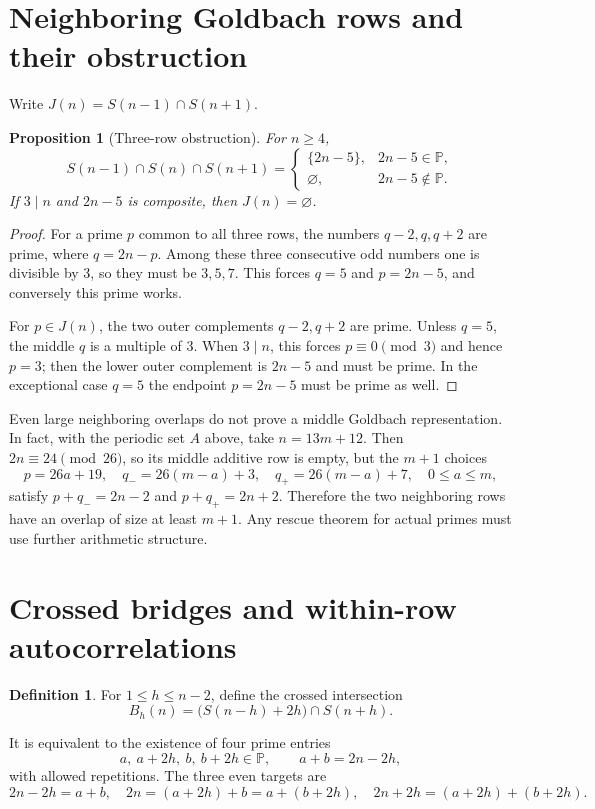 \documentclass[11pt,a4paper]{article}
\newtheorem{proposition}[theorem]{Proposition}
\theoremstyle{definition}
\newtheorem{definition}[theorem]{Definition}
\newcommand{\PP}{\mathbb P}
\begin{document}
\section{Neighboring Goldbach rows and their obstruction}
Write $J(n)=S(n-1)\cap S(n+1)$.
\begin{proposition}[Three-row obstruction]\label{prop:triple}
For $n\ge4$,
\begin{equation}\label{eq:triple}
 S(n-1)\cap S(n)\cap S(n+1)
 =\begin{cases}
 \{2n-5\},&2n-5\in\PP,\\
 \varnothing,&2n-5\notin\PP.
 \end{cases}
\end{equation}
If $3\mid n$ and $2n-5$ is composite, then $J(n)=\varnothing$.
\end{proposition}
\begin{proof}
For a prime $p$ common to all three rows, the numbers $q-2,q,q+2$ are prime, where $q=2n-p$. Among these three consecutive odd numbers one is divisible by 3, so they must be $3,5,7$. This forces $q=5$ and $p=2n-5$, and conversely this prime works.

For $p\in J(n)$, the two outer complements $q-2,q+2$ are prime. Unless $q=5$, the middle $q$ is a multiple of 3. When $3\mid n$, this forces $p\equiv0\pmod3$ and hence $p=3$; then the lower outer complement is $2n-5$ and must be prime. In the exceptional case $q=5$ the endpoint $p=2n-5$ must be prime as well.
\end{proof}

Even large neighboring overlaps do not prove a middle Goldbach representation. In fact, with the periodic set $A$ above, take $n=13m+12$. Then $2n\equiv24\pmod{26}$, so its middle additive row is empty, but the $m+1$ choices
\[
 p=26a+19,\quad q_-=26(m-a)+3,\quad q_+=26(m-a)+7,
 \quad 0\le a\le m,
\]
satisfy $p+q_-=2n-2$ and $p+q_+=2n+2$. Therefore the two neighboring rows have an overlap of size at least $m+1$. Any rescue theorem for actual primes must use further arithmetic structure.

\section{Crossed bridges and within-row autocorrelations}
\begin{definition}
For $1\le h\le n-2$, define the crossed intersection
\begin{equation}\label{eq:B}
 B_h(n)=\bigl(S(n-h)+2h\bigr)\cap S(n+h).
\end{equation}
\end{definition}
It is equivalent to the existence of four prime entries
\begin{equation}\label{eq:rectangle}
 a,\ a+2h,\ b,\ b+2h\in\PP,
 \qquad a+b=2n-2h,
\end{equation}
with allowed repetitions. The three even targets are
\[
 2n-2h=a+b,\quad
 2n=(a+2h)+b=a+(b+2h),\quad
 2n+2h=(a+2h)+(b+2h).
\]
\end{document}
